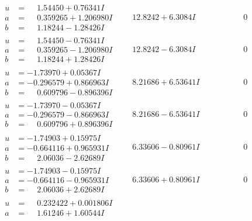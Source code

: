 \documentclass[1p]{elsarticle_modified}
\theoremstyle{definition}
\begin{document}
$$\begin{array}{c|c|c}
 \hline 
\begin{aligned}
u &= \phantom{-}1.54450 + 0.76341 I \\
a &= \phantom{-}0.359265 + 1.206980 I \\
b &= \phantom{-}1.18244 - 1.28426 I\end{aligned}
 & \phantom{-}12.8242 + 6.3084 I & \phantom{-0.000000 } 0 \\ \hline\begin{aligned}
u &= \phantom{-}1.54450 - 0.76341 I \\
a &= \phantom{-}0.359265 - 1.206980 I \\
b &= \phantom{-}1.18244 + 1.28426 I\end{aligned}
 & \phantom{-}12.8242 - 6.3084 I & \phantom{-0.000000 } 0 \\ \hline\begin{aligned}
u &= -1.73970 + 0.05367 I \\
a &= -0.296579 + 0.866963 I \\
b &= \phantom{-}0.609796 - 0.896396 I\end{aligned}
 & \phantom{-}8.21686 + 6.53641 I & \phantom{-0.000000 } 0 \\ \hline\begin{aligned}
u &= -1.73970 - 0.05367 I \\
a &= -0.296579 - 0.866963 I \\
b &= \phantom{-}0.609796 + 0.896396 I\end{aligned}
 & \phantom{-}8.21686 - 6.53641 I & \phantom{-0.000000 } 0 \\ \hline\begin{aligned}
u &= -1.74903 + 0.15975 I \\
a &= -0.664116 + 0.965931 I \\
b &= \phantom{-}2.06036 - 2.62689 I\end{aligned}
 & \phantom{-}6.33606 - 0.80961 I & \phantom{-0.000000 } 0 \\ \hline\begin{aligned}
u &= -1.74903 - 0.15975 I \\
a &= -0.664116 - 0.965931 I \\
b &= \phantom{-}2.06036 + 2.62689 I\end{aligned}
 & \phantom{-}6.33606 + 0.80961 I & \phantom{-0.000000 } 0 \\ \hline\begin{aligned}
u &= \phantom{-}0.232422 + 0.001806 I \\
a &= \phantom{-}1.61246 + 1.60544 I \\

\end{aligned}
\end{array}$$
\end{document}
